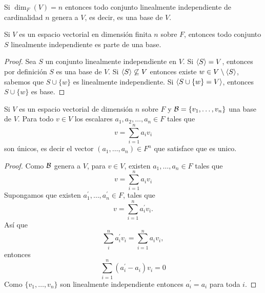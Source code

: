 \documentclass[12pt,a4paper]{book}
\begin{document}
    \begin{lema}
        Si $\dim_{F}(V)=n$ entonces todo conjunto linealmente independiente de cardinalidad $n$
        genera a $V$, es decir, es una base de $V$.
    \end{lema}

    \begin{proposicion}
        Si $V$ es un espacio vectorial en dimensión finita $n$ sobre $F$, entonces todo conjunto
        $S$ linealmente independiente es parte de una base.
    \end{proposicion}

    \begin{proof}
        Sea $S$ un conjunto linealmente independiente en $V$. Si $\langle S \rangle=V$, entonces por definición
        $S$ es una base de $V$. Si $\langle S \rangle\not\subseteq V$ entonces existe $w\in V\setminus\langle S \rangle$,
        sabemos que $S\cup\{w\}$ es linealmente independiente. Si $\langle S\cup\{w\}=V \rangle$, entonces
        $S\cup\{w\}$ es base. 
    \end{proof}

    \begin{proposicion}
        Si $V$ es un espacio vectorial de dimensión $n$ sobre $F$ y $\mathcal{B}=\{v_{1},\dots,v_{n}\}$
        una base de $V$. Para todo $v\in V$ los escalares $a_{1},a_{2},\dots,a_{n}\in F$ tales que
        \begin{equation*}
            v=\sum_{i=1}^{n}a_{i}v_{i}
        \end{equation*}
        son únicos, es decir el vector $(a_{1},\dots,a_{n})\in F^{n}$ que satisface que es unico.
    \end{proposicion}

    \begin{proof}
        Como $\mathcal{B}$ genera a $V$, para $v\in V$, existen $a_{1},\dots,a_{n}\in F$ tales que
        \begin{equation*}
            v=\sum_{i=1}^{n}a_{i}v_{i}
        \end{equation*}
        Supongamos que existen $a_{1}^{\prime},\dots,a_{n}^{\prime}\in F$, tales que
        \begin{equation*}
            v=\sum_{i=1}^{n}a_{i}^{\prime}v_{i}.
        \end{equation*}
        Así que
        \begin{equation*}
            \sum_{i}^{n}a_{i}^{\prime}v_{i}=\sum_{i=1}^{n}a_{i}v_{i},
        \end{equation*}
        entonces
        \begin{equation*}
            \sum_{i=1}^{n}(a_{i}^{\prime}-a_{i})v_{i}=0
        \end{equation*}
        Como $\{v_{1},\dots,v_{n}\}$ son linealmente independiente entonces $a_{i}^{\prime}=a_{i}$
        para toda $i$.
    \end{proof}
\end{document}
